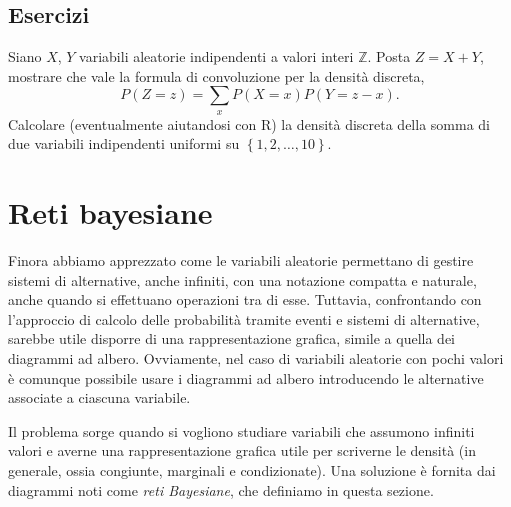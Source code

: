 \documentclass[
  italian,
  letterpaper,
]{book}
\newcommand{\cur}[1]{\left\{ #1 \right\}}
\theoremstyle{definition}
\theoremstyle{remark}
\begin{document}
\subsection{Esercizi}\label{esercizi-14}

Siano \(X\), \(Y\) variabili aleatorie indipendenti a valori interi
\(\mathbb{Z}\). Posta \(Z = X+Y\), mostrare che vale la formula di
convoluzione per la densità discreta,
\[ P( Z = z ) = \sum_{x} P(X=x)P(Y = z-x).\] Calcolare (eventualmente
aiutandosi con R) la densità discreta della somma di due variabili
indipendenti uniformi su \(\cur{1,2,\ldots, 10}\).

\section{Reti bayesiane}\label{sec-bayes-nets}

Finora abbiamo apprezzato come le variabili aleatorie permettano di
gestire sistemi di alternative, anche infiniti, con una notazione
compatta e naturale, anche quando si effettuano operazioni tra di esse.
Tuttavia, confrontando con l'approccio di calcolo delle probabilità
tramite eventi e sistemi di alternative, sarebbe utile disporre di una
rappresentazione grafica, simile a quella dei diagrammi ad albero.
Ovviamente, nel caso di variabili aleatorie con pochi valori è comunque
possibile usare i diagrammi ad albero introducendo le alternative
associate a ciascuna variabile.

Il problema sorge quando si vogliono studiare variabili che assumono
infiniti valori e averne una rappresentazione grafica utile per
scriverne le densità (in generale, ossia congiunte, marginali e
condizionate). Una soluzione è fornita dai diagrammi noti come
\emph{reti Bayesiane}, che definiamo in questa sezione.
\end{document}
